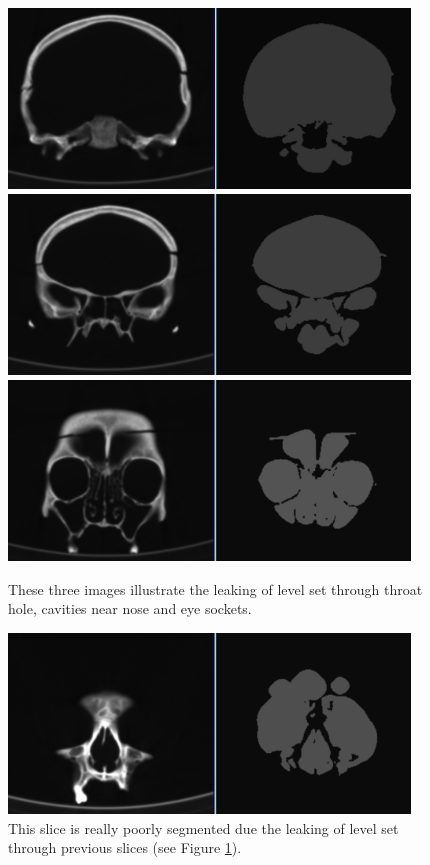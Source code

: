\begin{figure}
    \centering
    \includegraphics[width=0.95\textwidth]{data/png/20}
    \includegraphics[width=0.95\textwidth]{data/png/23}
    \includegraphics[width=0.95\textwidth]{data/png/27}
    \caption[Result of segmentation front slices of the skull data set]
{
These three images illustrate the leaking of level set through throat hole, cavities near nose and eye sockets.
}
    \label{fg:frontSlicesSegmentation}
\end{figure}

\begin{figure}
    \centering
    \includegraphics[width=0.95\textwidth]{data/png/29}
    \caption[Result of segmentation of slices near nose]{
This slice is really poorly segmented due the leaking of level set through previous slices (see Figure \ref{fg:frontSlicesSegmentation}).
}
    \label{fg:noseSlicesSegmentation}
\end{figure}
